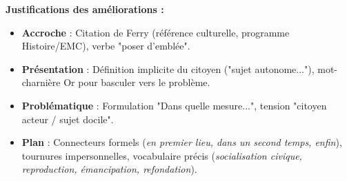 \documentclass[11pt]{article}
\newcommand{\cle}[1]{{\popxbold\color{popdark}#1}}
\begin{document}
\begin{exoresolu}
    \textbf{Justifications des améliorations :}
    \begin{itemize}
        \item \textbf{Accroche} : Citation de Ferry (référence culturelle, programme Histoire/EMC), verbe "poser d'emblée".
        \item \textbf{Présentation} : Définition implicite du citoyen ("sujet autonome..."), mot-charnière \cle{Or} pour basculer vers le problème.
        \item \textbf{Problématique} : Formulation "Dans quelle mesure...", tension "citoyen acteur / sujet docile".
        \item \textbf{Plan} : Connecteurs formels (\emph{en premier lieu, dans un second temps, enfin}), tournures impersonnelles, vocabulaire précis (\emph{socialisation civique, reproduction, émancipation, refondation}).
    \end{itemize}
\end{exoresolu}
\end{document}
